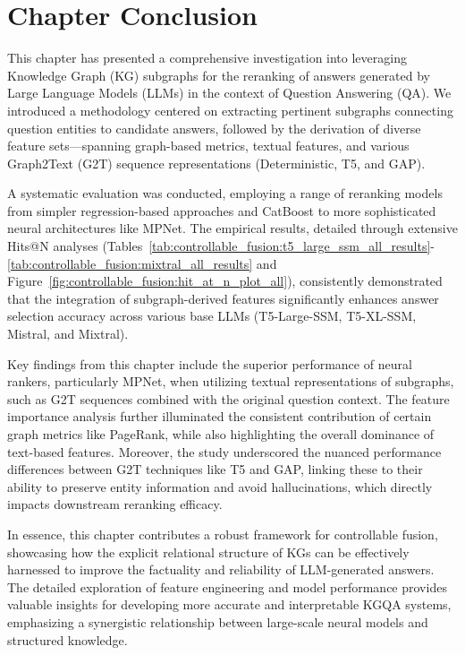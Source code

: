 \section{Chapter Conclusion}
\label{sec:controllable_fusion:chapter_conclusion}

This chapter has presented a comprehensive investigation into leveraging Knowledge Graph (KG) subgraphs for the reranking of answers generated by Large Language Models (LLMs) in the context of Question Answering (QA). We introduced a methodology centered on extracting pertinent subgraphs connecting question entities to candidate answers, followed by the derivation of diverse feature sets—spanning graph-based metrics, textual features, and various Graph2Text (G2T) sequence representations (Deterministic, T5, and GAP).

A systematic evaluation was conducted, employing a range of reranking models from simpler regression-based approaches and CatBoost to more sophisticated neural architectures like MPNet. The empirical results, detailed through extensive Hits@N analyses (Tables~\ref{tab:controllable_fusion:t5_large_ssm_all_results}-\ref{tab:controllable_fusion:mixtral_all_results} and Figure~\ref{fig:controllable_fusion:hit_at_n_plot_all}), consistently demonstrated that the integration of subgraph-derived features significantly enhances answer selection accuracy across various base LLMs (T5-Large-SSM, T5-XL-SSM, Mistral, and Mixtral).

Key findings from this chapter include the superior performance of neural rankers, particularly MPNet, when utilizing textual representations of subgraphs, such as G2T sequences combined with the original question context. The feature importance analysis further illuminated the consistent contribution of certain graph metrics like PageRank, while also highlighting the overall dominance of text-based features. Moreover, the study underscored the nuanced performance differences between G2T techniques like T5 and GAP, linking these to their ability to preserve entity information and avoid hallucinations, which directly impacts downstream reranking efficacy.

In essence, this chapter contributes a robust framework for controllable fusion, showcasing how the explicit relational structure of KGs can be effectively harnessed to improve the factuality and reliability of LLM-generated answers. The detailed exploration of feature engineering and model performance provides valuable insights for developing more accurate and interpretable KGQA systems, emphasizing a synergistic relationship between large-scale neural models and structured knowledge.